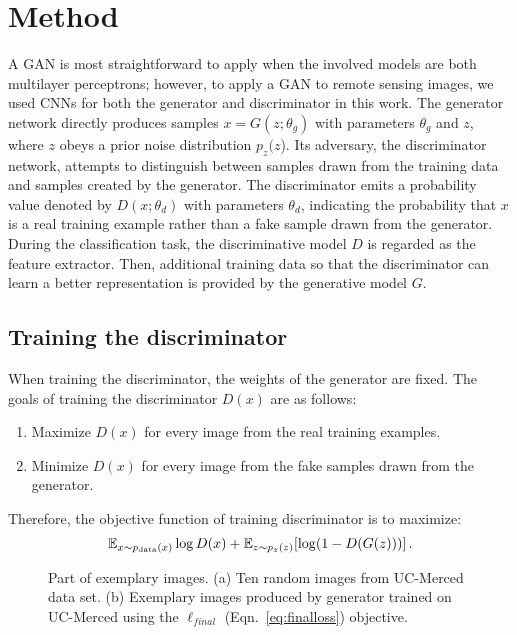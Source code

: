 \documentclass[journal]{IEEEtran}
\begin{document}

\section{Method}


\label{sec:method}
A GAN is most straightforward to apply when the involved models are both multilayer perceptrons; however, to apply a GAN to remote sensing images, we used CNNs for both the generator and discriminator in this work. The generator network directly produces samples $x=G(z;\theta_g)$ with parameters $\theta_g$ and $z$, where $z$ obeys a prior noise distribution $p_z(z$). Its adversary, the discriminator network, attempts to distinguish between samples drawn from the training data and samples created by the generator. The discriminator emits a probability value denoted by $D(x;\theta_d)$ with parameters $\theta_d$, indicating the probability that $x$ is a real training example rather than a fake sample drawn from the generator. During the classification task, the discriminative model $D$ is regarded as the feature extractor. Then, additional training data so that the discriminator can learn a better representation is provided by the generative model $G$.
\vspace{-1em}
\subsection{Training the discriminator}
When training the discriminator, the weights of the generator are fixed. The goals of training the discriminator $D(x)$ are as follows:

\begin{enumerate}
	\item Maximize $D(x)$ for every image from the real training examples.
	\item Minimize $D(x)$ for every image from the fake samples drawn from the generator.
\end{enumerate}

Therefore, the objective function of training discriminator is to maximize:
\begin{equation}{\mathbb E}_{x\sim p_{\rm data}(x)} \log D(x) +
{\mathbb E}_{z\sim p_z(z)}[\log (1-D(G(z)))] \,.
\label{eq:minmax}
\end{equation}


\begin{figure*} 
	\centering
	\hfill
	
	\caption{Part of exemplary images. (a) Ten random images from UC-Merced data set. (b) Exemplary images produced by generator trained on UC-Merced using the $\ell _{final}$ (Eqn.~\ref{eq:finalloss}) objective.}
	\label{ucland} 
	\vspace{-2mm}
\end{figure*}
\vspace{-1em}
\end{document}
